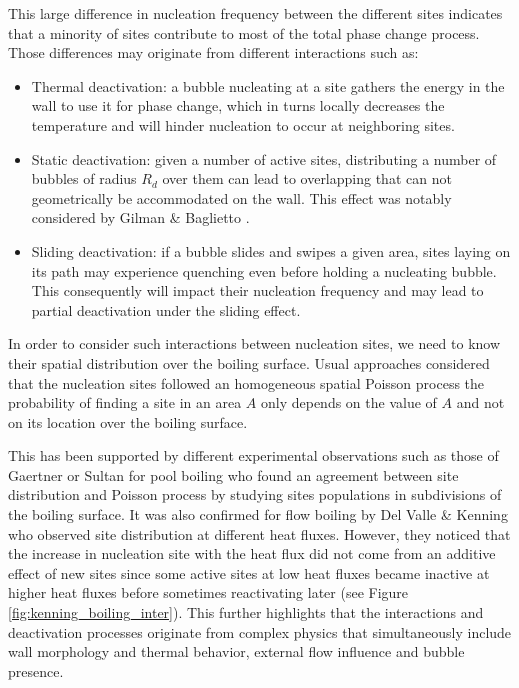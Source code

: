 \npar

This large difference in nucleation frequency between the different sites indicates that a minority of sites contribute to most of the total phase change process. Those differences may originate from different interactions such as:

\begin{itemize}
\item Thermal deactivation: a bubble nucleating at a site gathers the energy in the wall to use it for phase change, which in turns locally decreases the temperature and will hinder nucleation to occur at neighboring sites.
\item Static deactivation: given a number of active sites, distributing a number of bubbles of radius $R_{d}$ over them can lead to overlapping that can not geometrically be accommodated on the wall. This effect was notably considered by Gilman \& Baglietto \cite{gilman_self-consistent_2017}.
\item Sliding deactivation: if a bubble slides and swipes a given area, sites laying on its path may experience quenching even before holding a nucleating bubble. This consequently will impact their nucleation frequency and may lead to partial deactivation under the sliding effect.
\end{itemize} 


In order to consider such interactions between nucleation sites, we need to know their spatial distribution over the boiling surface. Usual approaches considered that the nucleation sites followed an homogeneous spatial Poisson process \ie the probability of finding a site in an area $A$ only depends on the value of $A$ and not on its location over the boiling surface.

\npar
This has been supported by different experimental observations such as those of Gaertner \cite{gaertner_population_1960} or Sultan \cite{sultan_spatial_1978} for pool boiling who found an agreement between site distribution and Poisson process by studying sites populations in subdivisions of the boiling surface. It was also confirmed for flow boiling by Del Valle \& Kenning \cite{del_valle_subcooled_1985} who observed site distribution at different heat fluxes. However, they noticed that the increase in nucleation site with the heat flux did not come from an additive effect of new sites since some active sites at low heat fluxes became inactive at higher heat fluxes before sometimes reactivating later (see Figure \ref{fig:kenning_boiling_inter}). This further highlights that the interactions and deactivation processes originate from complex physics that simultaneously include wall morphology and thermal behavior, external flow influence and bubble presence. 

